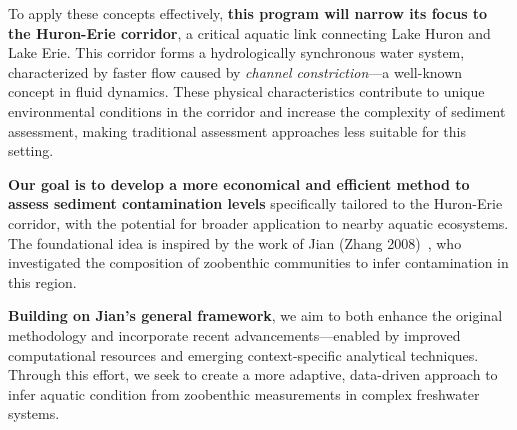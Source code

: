 \medskip

To apply these concepts effectively, \textbf{this program will narrow its focus to the Huron-Erie corridor}, 
a critical aquatic link connecting Lake Huron and Lake Erie. This corridor forms a 
hydrologically synchronous water system, characterized by faster flow 
caused by \textit{channel constriction}—a well-known concept in fluid dynamics. 
These physical characteristics contribute to unique environmental conditions in the corridor 
and increase the complexity of sediment assessment, making traditional assessment approaches 
less suitable for this setting.

\medskip

\textbf{Our goal is to develop a more economical and efficient method to assess sediment contamination levels} 
specifically tailored to the Huron-Erie corridor, with the potential for broader application 
to nearby aquatic ecosystems. The foundational idea is inspired by the work of Jian 
(Zhang 2008)~\cite{Zhang2008}, who investigated the composition of zoobenthic 
communities to infer contamination in this region.

\textbf{Building on Jian's general framework}, we aim to both enhance the original methodology and 
incorporate recent advancements—enabled by improved computational resources and 
emerging context-specific analytical techniques. Through this effort, we seek to create a 
more adaptive, data-driven approach to infer aquatic condition from zoobenthic measurements in complex freshwater systems.